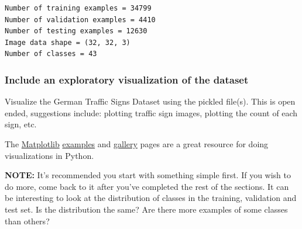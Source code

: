 \documentclass[11pt]{article}
\begin{document}
    \begin{Verbatim}[commandchars=\\\{\}]
Number of training examples = 34799
Number of validation examples = 4410
Number of testing examples = 12630
Image data shape = (32, 32, 3)
Number of classes = 43

    \end{Verbatim}

    \subsubsection{Include an exploratory visualization of the
dataset}\label{include-an-exploratory-visualization-of-the-dataset}

    Visualize the German Traffic Signs Dataset using the pickled file(s).
This is open ended, suggestions include: plotting traffic sign images,
plotting the count of each sign, etc.

The \href{http://matplotlib.org/}{Matplotlib}
\href{http://matplotlib.org/examples/index.html}{examples} and
\href{http://matplotlib.org/gallery.html}{gallery} pages are a great
resource for doing visualizations in Python.

\textbf{NOTE:} It's recommended you start with something simple first.
If you wish to do more, come back to it after you've completed the rest
of the sections. It can be interesting to look at the distribution of
classes in the training, validation and test set. Is the distribution
the same? Are there more examples of some classes than others?
\end{document}
